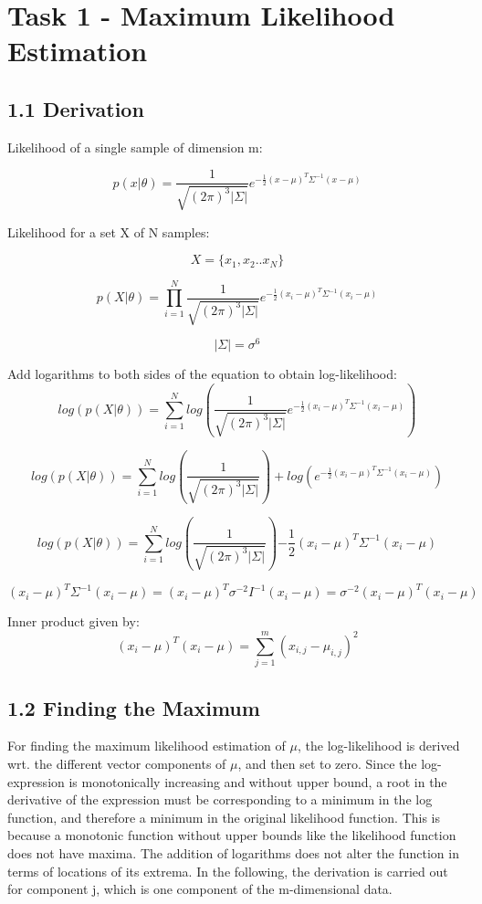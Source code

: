 
\section{Task 1 - Maximum Likelihood Estimation}



\subsection*{1.1 Derivation}

Likelihood of a single sample of dimension m:

$$
p(x|\theta) = \frac{1}{\sqrt{(2 \pi )^3 \vert \Sigma \vert}} e^{-\frac{1}{2} (x-\mu )^T \Sigma ^{-1} (x-\mu)}
$$

Likelihood for a set X of N samples:

$$
X = \{x_1, x_2 .. x_N\}
$$


$$
p(X|\theta) = \prod_{i=1}^{N} \frac{1}{\sqrt{(2 \pi )^3 \vert \Sigma \vert}} e^{-\frac{1}{2} (x_i-\mu )^T \Sigma ^{-1} (x_i-\mu)}
$$



$$
\vert \Sigma \vert = \sigma^6
$$


Add logarithms to both sides of the equation to obtain log-likelihood:
$$
log(p(X|\theta)) = \sum_{i=1}^{N}log(\frac{1}{\sqrt{(2 \pi )^3 \vert \Sigma \vert}} e^{-\frac{1}{2} (x_i-\mu )^T \Sigma ^{-1} (x_i-\mu)})
$$

$$
log(p(X|\theta)) = \sum_{i=1}^{N} log(\frac{1}{\sqrt{(2 \pi )^3 \vert \Sigma \vert}}) + log( e^{-\frac{1}{2} (x_i-\mu )^T \Sigma ^{-1} (x_i-\mu)})
$$

$$
log(p(X|\theta)) = \sum_{i=1}^{N} log(\frac{1}{\sqrt{(2 \pi )^3 \vert \Sigma \vert}})  {-\frac{1}{2} (x_i-\mu )^T \Sigma ^{-1} (x_i-\mu)}
$$





$$
(x_i-\mu )^T \Sigma ^{-1} (x_i-\mu) = (x_i-\mu )^T \sigma^{-2} I ^{-1} (x_i-\mu) = \sigma^{-2} (x_i-\mu )^T (x_i-\mu)
$$


Inner product given by:
$$
(x_i-\mu )^T  (x_i-\mu) = \sum_{j=1}^{m} (x_{i,j} - \mu_{i,j})^2
$$

\subsection*{1.2 Finding the Maximum}

For finding the maximum likelihood estimation of $\mu$, the log-likelihood is derived wrt. the different vector components of $\mu$, and then set to zero. Since the log-expression is monotonically increasing and without upper bound, a root in the derivative of the expression must be corresponding to a minimum in the log function, and therefore a minimum in the original likelihood function. This is because a monotonic function without upper bounds like the likelihood function does not have maxima. The addition of logarithms does not alter the function in terms of locations of its extrema.
In the following, the derivation is carried out for component j, which is one component of the m-dimensional data.

